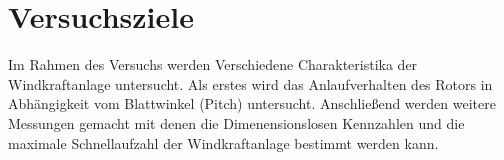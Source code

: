 \section{Versuchsziele}
Im Rahmen des Versuchs werden Verschiedene Charakteristika der Windkraftanlage untersucht. Als erstes wird das Anlaufverhalten des Rotors in Abhängigkeit vom Blattwinkel (Pitch) untersucht. Anschließend werden weitere Messungen gemacht mit denen die Dimenensionslosen Kennzahlen und die maximale Schnellaufzahl der Windkraftanlage bestimmt werden kann.


